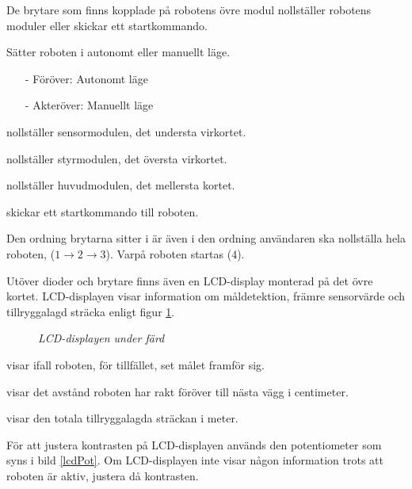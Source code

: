 \documentclass[11pt]{article}
\begin{document}
De brytare som finns kopplade på robotens övre modul nollställer robotens moduler eller skickar ett startkommando. 
\begin{description}[style=unboxed, leftmargin=0cm]
  \item[Brytare 1] Sätter roboten i autonomt eller manuellt läge. 
    \begin{itemize}
      \setlength\itemsep{-0.5em}
      \item[-] Föröver: Autonomt läge
      \item[-] Akteröver: Manuellt läge
    \end{itemize}
  \item[Brytare 2] nollställer sensormodulen, det understa virkortet.
  \item[Brytare 3] nollställer styrmodulen, det översta virkortet.
  \item[Brytare 4] nollställer huvudmodulen, det mellersta kortet.
  \item[Brytare 5] skickar ett startkommando till roboten.
\end{description}

Den ordning brytarna sitter i är även i den ordning användaren ska nollställa hela roboten, ($1 \rightarrow 2 \rightarrow 3$). Varpå roboten startas ($4$).

Utöver dioder och brytare finns även en LCD-display monterad på det övre kortet. LCD-displayen visar information om måldetektion, främre sensorvärde och tillryggalagd sträcka enligt figur \ref{lcd}.

\begin{figure}[htbp]
	\centering
	
	\caption{\textit{LCD-displayen under färd} \label{lcd}}
\end{figure}

\begin{description}[style=unboxed, leftmargin=0cm]
  \item[Target] visar ifall roboten, för tillfället, set målet framför sig.
  \item[Forw] visar det avstånd roboten har rakt föröver till nästa vägg i centimeter.
  \item[Trip] visar den totala tillryggalagda sträckan i meter.
\end{description}

För att justera kontrasten på LCD-displayen används den potentiometer som syns i bild \ref{lcdPot}. Om LCD-displayen inte visar någon information trots att roboten är aktiv, justera då kontrasten.
\end{document}
